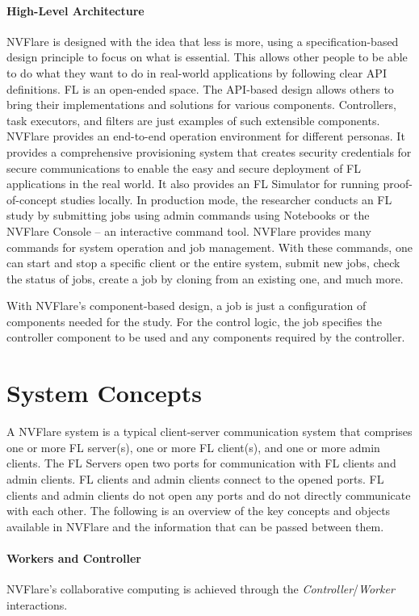 \documentclass[11pt]{article}
\begin{document}
\paragraph{High-Level Architecture} NVFlare is designed with the idea that less is more, using a specification-based design principle to focus on what is essential.
%
This allows other people to be able to do what they want to do in real-world applications by following clear API definitions. FL is an open-ended space. The API-based design allows others to bring their implementations and solutions for various components. Controllers, task executors, and filters are just examples of such extensible components.
%
NVFlare provides an end-to-end operation environment for different personas. It provides a comprehensive provisioning system that creates security credentials for secure communications to enable the easy and secure deployment of FL applications in the real world. It also provides an FL Simulator for running proof-of-concept studies locally.
%
In production mode, the researcher conducts an FL study by submitting jobs using admin commands using Notebooks or the NVFlare Console -- an interactive command tool. NVFlare provides many commands for system operation and job management. With these commands, one can start and stop a specific client or the entire system, submit new jobs, check the status of jobs, create a job by cloning from an existing one, and much more.

%
With NVFlare's component-based design, a job is just a configuration of components needed for the study. For the control logic, the job specifies the controller component to be used and any components required by the controller.
%
\section{System Concepts}
%
A NVFlare system is a typical client-server communication system that comprises one or more FL server(s), one or more FL client(s), and one or more admin clients. The FL Servers open two ports for communication with FL clients and admin clients. FL clients and admin clients connect to the opened ports. FL clients and admin clients do not open any ports and do not directly communicate with each other.
%
The following is an overview of the key concepts and objects available in NVFlare and the information that can be passed between them.

\paragraph{Workers and Controller} NVFlare’s collaborative computing is achieved through the \textit{Controller}/\textit{Worker} interactions.
\end{document}
